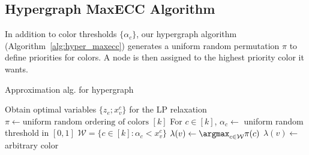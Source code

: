 \subsection{Hypergraph MaxECC Algorithm}
In addition to color thresholds $\{\alpha_c\}$, our hypergraph \maxecc{} algorithm (Algorithm~\ref{alg:hyper_maxecc}) generates a uniform random permutation  $\pi$ to define priorities for colors. A node is then assigned to the highest priority color it wants.
\begin{algorithm}[t]
	\caption{Approximation alg. for hypergraph \maxecc{}}
	\label{alg:hyper_maxecc}
	\begin{algorithmic}
		\STATE Obtain optimal variables $\{z_e; x_v^c\}$ for the LP relaxation
		\STATE $\pi \leftarrow \text{uniform random ordering of colors } [k]$
		\STATE For $c \in [k]$, $\alpha_c \leftarrow $ uniform random threshold in $[0,1]$
		\STATE $\mathcal{W} = \{c \in [k] \colon \alpha_c < x_v^c\}$
		\STATE $\lambda(v) \leftarrow \argmax_{c \in \mathcal{W}} \pi(c)$
		\ELSE
		\STATE $\lambda(v) \leftarrow $ arbitrary color
		\ENDIF
		\ENDFOR
	\end{algorithmic}
\end{algorithm}

